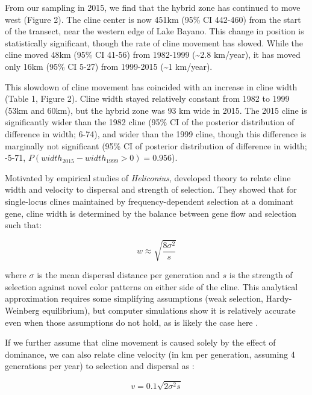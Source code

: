 \documentclass[]{article}
\begin{document}
From our sampling in 2015, we find that the hybrid zone has continued to
move west (Figure 2). The cline center is now 451km (95\% CI 442-460)
from the start of the transect, near the western edge of Lake Bayano.
This change in position is statistically significant, though the rate of
cline movement has slowed. While the cline moved 48km (95\% CI 41-56)
from 1982-1999 (\textasciitilde{}2.8 km/year), it has moved only 16km
(95\% CI 5-27) from 1999-2015 (\textasciitilde{}1 km/year).

This slowdown of cline movement has coincided with an increase in cline
width (Table 1, Figure 2). Cline width stayed relatively constant from
1982 to 1999 (53km and 60km), but the hybrid zone was 93 km wide in
2015. The 2015 cline is significantly wider than the 1982 cline (95\% CI
of the posterior distribution of difference in width; 6-74), and wider
than the 1999 cline, though this difference is marginally not
significant (95\% CI of posterior distribution of difference in width;
-5-71, \(P(width_{2015} - width_{1999} > 0) = 0.956\)).

Motivated by empirical studies of \textit{Heliconius},
\citet{Mallet:1989vq} developed theory to relate cline width and
velocity to dispersal and strength of selection. They showed that for
single-locus clines maintained by frequency-dependent selection at a
dominant gene, cline width is determined by the balance between gene
flow and selection such that:

\begin{equation}
\label{eq:width}
w \approx \sqrt{\frac{8\sigma^2}{s}}
\end{equation}

where \(\sigma\) is the mean dispersal distance per generation and \(s\)
is the strength of selection against novel color patterns on either side
of the cline. This analytical approximation requires some simplifying
assumptions (weak selection, Hardy-Weinberg equilibrium), but computer
simulations show it is relatively accurate even when those assumptions
do not hold, as is likely the case here \citep{Mallet:1989vq}.

If we further assume that cline movement is caused solely by the effect
of dominance, we can also relate cline velocity (in km per generation,
assuming 4 generations per year) to selection and dispersal as
\citep{Mallet:1989vq, Blum:2002wr}:

\begin{equation}
\label{eq:velocity}
v = 0.1\sqrt{2\sigma^{2}s}
\end{equation}
\end{document}
